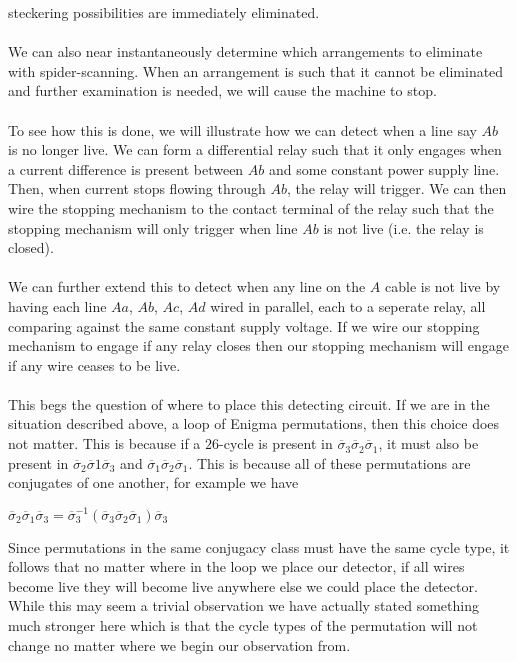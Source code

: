 steckering possibilities are immediately eliminated.
\\\\We can also near instantaneously determine which arrangements to
eliminate with spider-scanning. When an arrangement is such that it
cannot be eliminated and further examination is needed, we will cause
the machine to stop.
\\\\To see how this is done, we will illustrate how we can detect
when a line say $Ab$ is no longer live. We can form a differential
relay such that it only engages when a current difference is present
between $Ab$ and some constant power supply line. Then, when current stops
flowing through $Ab$, the relay will trigger. We can then wire the
stopping mechanism to the contact terminal of the relay such that the
stopping mechanism will only trigger when line $Ab$ is not live (i.e.
the relay is closed).
\\\\We can further extend this to detect when any line on the $A$
cable is not live by having each line $Aa$, $Ab$, $Ac$, $Ad$ wired in
parallel, each to a seperate relay, all comparing against the same
constant supply voltage. If we wire our stopping mechanism to engage
if any relay closes
then our stopping mechanism will engage if any wire ceases to be live.
\\\\This begs the question of where to place this detecting circuit.
If we are in the situation described above, a loop of Enigma
permutations, then this choice does not matter. This is because if a
$26$-cycle is present in
$\overline\sigma_3\overline\sigma_2\overline\sigma_1$, it must also
be present in
$\overline\sigma_2\overline\sigma1\overline\sigma_3$ and
$\overline\sigma_1\overline\sigma_2\overline\sigma_1$. This is
because all of these permutations are conjugates of one another, for
example we have
\begin{center}
  $\overline\sigma_2\overline\sigma_1\overline\sigma_3 =
  \overline\sigma_3^{-1}(\overline\sigma_3\overline\sigma_2\overline\sigma_1)\overline\sigma_3$
\end{center}
Since permutations in the same conjugacy class must have the same
cycle type, it follows that no matter where in the loop we place our
detector, if all wires become live they will become live anywhere
else we could place the detector.
While this may seem a trivial observation we have actually stated
something much stronger here which is that the cycle types of the
permutation will not change no matter where we begin our observation from.

